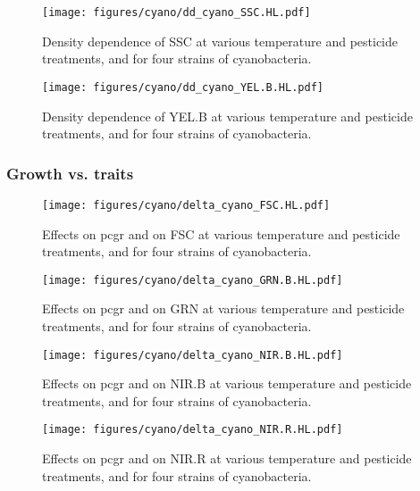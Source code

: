 \begin{figure}[hbt!]
    \centering
    \texttt{[image: figures/cyano/dd\_cyano\_SSC.HL.pdf]}
    \caption{Density dependence of SSC at various temperature and pesticide treatments, and for four strains of cyanobacteria.}
    \label{fig:dd_cyano_SSC.HL}
\end{figure}

\begin{figure}[hbt!]
    \centering
    \texttt{[image: figures/cyano/dd\_cyano\_YEL.B.HL.pdf]}
    \caption{Density dependence of YEL.B at various temperature and pesticide treatments, and for four strains of cyanobacteria.}
    \label{fig:dd_cyano_YEL.B.HL}
\end{figure}

\clearpage

\subsubsection{Growth vs. traits}

\begin{figure}[hbt!]
    \centering
    \texttt{[image: figures/cyano/delta\_cyano\_FSC.HL.pdf]}
    \caption{Effects on pcgr and on FSC at various temperature and pesticide treatments, and for four strains of cyanobacteria.}
    \label{fig:delta_cyano_FSC.HL}
\end{figure}

\begin{figure}[hbt!]
    \centering
    \texttt{[image: figures/cyano/delta\_cyano\_GRN.B.HL.pdf]}
    \caption{Effects on pcgr and on GRN at various temperature and pesticide treatments, and for four strains of cyanobacteria.}
    \label{fig:delta_cyano_GRN.B.HL}
\end{figure}

\begin{figure}[hbt!]
    \centering
    \texttt{[image: figures/cyano/delta\_cyano\_NIR.B.HL.pdf]}
    \caption{Effects on pcgr and on NIR.B at various temperature and pesticide treatments, and for four strains of cyanobacteria.}
    \label{fig:delta_cyano_NIR.B.HL}
\end{figure}

\begin{figure}[hbt!]
    \centering
    \texttt{[image: figures/cyano/delta\_cyano\_NIR.R.HL.pdf]}
    \caption{Effects on pcgr and on NIR.R at various temperature and pesticide treatments, and for four strains of cyanobacteria.}
    \label{fig:delta_cyano_NIR.R.HL}
\end{figure}

